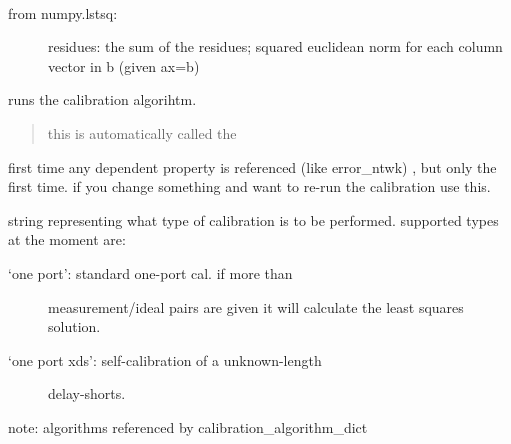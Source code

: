 \documentclass[letterpaper,10pt,english]{sphinxmanual}
\begin{document}
\begin{fulllineitems}
\begin{fulllineitems}
\begin{description}
\end{description}

\end{fulllineitems}


\begin{fulllineitems}
\label{auto_calibration:mwavepy.Calibration.residuals}~\begin{description}
\item[{from numpy.lstsq:}] \leavevmode
residues:
the sum of the residues; squared euclidean norm for 
each column vector in b (given ax=b)

\end{description}

\end{fulllineitems}


\begin{fulllineitems}
\label{auto_calibration:mwavepy.Calibration.run}
runs the calibration algorihtm.
\begin{quote}

this is automatically called the
\end{quote}

first time      any dependent property is referenced (like error\_ntwk)
, but only the first time. if you change something and want to
re-run the calibration use this.

\end{fulllineitems}


\begin{fulllineitems}
\label{auto_calibration:mwavepy.Calibration.type}
string representing what type of calibration is to be
performed. supported types at the moment are:
\begin{description}
\item[{`one port':     standard one-port cal. if more than}]  measurement/ideal pairs are given it will
calculate the least squares solution.

\item[{`one port xds': self-calibration of a unknown-length}] \leavevmode
delay-shorts.

\end{description}

note:
algorithms referenced by  calibration\_algorithm\_dict

\end{fulllineitems}


\end{fulllineitems}
\end{document}
